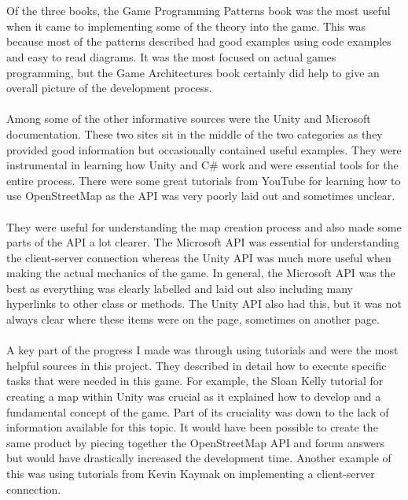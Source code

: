 \documentclass[a4paper]{report}
\begin{document}
\\\\
Of the three books, the Game Programming Patterns book was the most useful when it came to implementing some of the theory into the game. This was because most of the patterns described had good examples using code examples and easy to read diagrams. It was the most focused on actual games programming, but the Game Architectures book certainly did help to give an overall picture of the development process.
\\\\
Among some of the other informative sources were the Unity and Microsoft documentation. These two sites sit in the middle of the two categories as they provided good information but occasionally contained useful examples. They were instrumental in learning how Unity and C\# work and were essential tools for the entire process. There were some great tutorials from YouTube for learning how to use OpenStreetMap as the API was very poorly laid out and sometimes unclear. 
\pagebreak
\\\\
They were useful for understanding the map creation process and also made some parts of the API a lot clearer. The Microsoft API was essential for understanding the client-server connection whereas the Unity API was much more useful when making the actual mechanics of the game. In general, the Microsoft API was the best as everything was clearly labelled and laid out also including many hyperlinks to other class or methods. The Unity API also had this, but it was not always clear where these items were on the page, sometimes on another page. \cite{Unity} \cite{Server} \cite{API}
\\\\
A key part of the progress I made was through using tutorials and were the most helpful sources in this project. They described in detail how to execute specific tasks that were needed in this game. For example, the Sloan Kelly tutorial for creating a map within Unity was crucial as it explained how to develop and a fundamental concept of the game. Part of its cruciality was down to the lack of information available for this topic. It would have been possible to create the same product by piecing together the OpenStreetMap API and forum answers but would have drastically increased the development time. Another example of this was using tutorials from Kevin Kaymak on implementing a client-server connection.  \cite{Sloan} \cite{Kaymak}
\\\\
\end{document}
